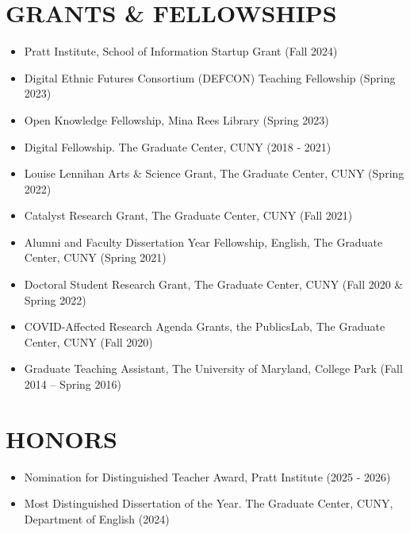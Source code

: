 \documentclass[a4paper,11pt]{article}
\begin{document}
\section*{GRANTS \& FELLOWSHIPS}
\label{sec:org1c67704}
\begin{itemize}
\item Pratt Institute, School of Information Startup Grant (Fall 2024)
\item Digital Ethnic Futures Consortium (DEFCON) Teaching Fellowship
(Spring 2023)
\item Open Knowledge Fellowship, Mina Rees Library (Spring 2023)
\item Digital Fellowship. The Graduate Center, CUNY (2018 - 2021)
\item Louise Lennihan Arts \& Science Grant, The Graduate Center, CUNY
(Spring 2022)
\item Catalyst Research Grant, The Graduate Center, CUNY (Fall 2021)
\item Alumni and Faculty Dissertation Year Fellowship, English, The
Graduate Center, CUNY (Spring 2021)
\item Doctoral Student Research Grant, The Graduate Center, CUNY (Fall
2020 \& Spring 2022)
\item COVID-Affected Research Agenda Grants, the PublicsLab, The Graduate
Center, CUNY (Fall 2020)
\item Graduate Teaching Assistant, The University of Maryland, College
Park (Fall 2014 – Spring 2016)
\end{itemize}

\section*{HONORS}
\label{sec:orga885428}
\begin{itemize}
\item Nomination for Distinguished Teacher Award, Pratt Institute
(2025 - 2026)
\item Most Distinguished Dissertation of the Year. The Graduate Center,
CUNY, Department of English (2024)
\end{itemize}
\end{document}
